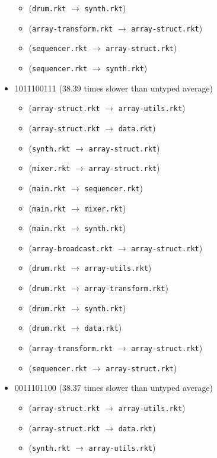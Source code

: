\documentclass{article}
\newcommand{\mono}[1]{\texttt{#1}}
\begin{document}
\begin{itemize}
\begin{itemize}
  \item (\mono{drum.rkt} $\rightarrow$ \mono{synth.rkt})
  \item (\mono{array-transform.rkt} $\rightarrow$ \mono{array-struct.rkt})
  \item (\mono{sequencer.rkt} $\rightarrow$ \mono{array-struct.rkt})
  \item (\mono{sequencer.rkt} $\rightarrow$ \mono{synth.rkt})
  \end{itemize}
\item 1011100111 (38.39 times slower than untyped average)
  \begin{itemize}
  \item (\mono{array-struct.rkt} $\rightarrow$ \mono{array-utils.rkt})
  \item (\mono{array-struct.rkt} $\rightarrow$ \mono{data.rkt})
  \item (\mono{synth.rkt} $\rightarrow$ \mono{array-struct.rkt})
  \item (\mono{mixer.rkt} $\rightarrow$ \mono{array-struct.rkt})
  \item (\mono{main.rkt} $\rightarrow$ \mono{sequencer.rkt})
  \item (\mono{main.rkt} $\rightarrow$ \mono{mixer.rkt})
  \item (\mono{main.rkt} $\rightarrow$ \mono{synth.rkt})
  \item (\mono{array-broadcast.rkt} $\rightarrow$ \mono{array-struct.rkt})
  \item (\mono{drum.rkt} $\rightarrow$ \mono{array-utils.rkt})
  \item (\mono{drum.rkt} $\rightarrow$ \mono{array-transform.rkt})
  \item (\mono{drum.rkt} $\rightarrow$ \mono{synth.rkt})
  \item (\mono{drum.rkt} $\rightarrow$ \mono{data.rkt})
  \item (\mono{array-transform.rkt} $\rightarrow$ \mono{array-struct.rkt})
  \item (\mono{sequencer.rkt} $\rightarrow$ \mono{array-struct.rkt})
  \end{itemize}
\item 0011101100 (38.37 times slower than untyped average)
  \begin{itemize}
  \item (\mono{array-struct.rkt} $\rightarrow$ \mono{array-utils.rkt})
  \item (\mono{array-struct.rkt} $\rightarrow$ \mono{data.rkt})
  \item (\mono{synth.rkt} $\rightarrow$ \mono{array-utils.rkt})

\end{itemize}
\end{itemize}
\end{document}
